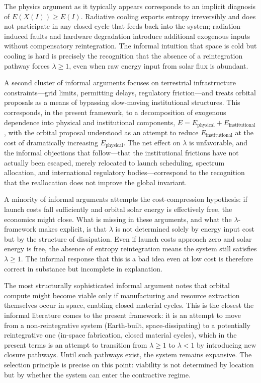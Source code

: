 \documentclass[11pt,a4paper]{article}
\theoremstyle{plain}
\theoremstyle{definition}
\theoremstyle{remark}
\begin{document}
The physics argument as it typically appears corresponds to an implicit
diagnosis of $E(X(I)) \geq E(I)$. Radiative cooling exports entropy
irreversibly and does not participate in any closed cycle that feeds back into
the system; radiation-induced faults and hardware degradation introduce
additional exogenous inputs without compensatory reintegration. The informal
intuition that space is cold but cooling is hard is precisely the recognition
that the absence of a reintegration pathway forces $\lambda \geq 1$, even when
raw energy input from solar flux is abundant.

A second cluster of informal arguments focuses on terrestrial infrastructure
constraints---grid limits, permitting delays, regulatory friction---and treats
orbital proposals as a means of bypassing slow-moving institutional structures.
This corresponds, in the present framework, to a decomposition of exogenous
dependence into physical and institutional components,
$E = E_{\mathrm{physical}} + E_{\mathrm{institutional}}$, with the orbital
proposal understood as an attempt to reduce $E_{\mathrm{institutional}}$ at the
cost of dramatically increasing $E_{\mathrm{physical}}$. The net effect on
$\lambda$ is unfavorable, and the informal objections that follow---that the
institutional frictions have not actually been escaped, merely relocated to
launch scheduling, spectrum allocation, and international regulatory
bodies---correspond to the recognition that the reallocation does not improve
the global invariant.

A minority of informal arguments attempts the cost-compression hypothesis:
if launch costs fall sufficiently and orbital solar energy is effectively free,
the economics might close. What is missing in these arguments, and what the
$\lambda$-framework makes explicit, is that $\lambda$ is not determined solely
by energy input cost but by the structure of dissipation. Even if launch costs
approach zero and solar energy is free, the absence of entropy reintegration
means the system still satisfies $\lambda \geq 1$. The informal response that
this is a bad idea even at low cost is therefore correct in substance but
incomplete in explanation.

The most structurally sophisticated informal argument notes that orbital
compute might become viable only if manufacturing and resource extraction
themselves occur in space, enabling closed material cycles. This is the closest
the informal literature comes to the present framework: it is an attempt to
move from a non-reintegrative system (Earth-built, space-dissipating) to a
potentially reintegrative one (in-space fabrication, closed material cycles),
which in the present terms is an attempt to transition from $\lambda \geq 1$ to
$\lambda < 1$ by introducing new closure pathways. Until such pathways exist,
the system remains expansive. The selection principle is precise on this point:
viability is not determined by location but by whether the system can enter the
contractive regime.
\end{document}
